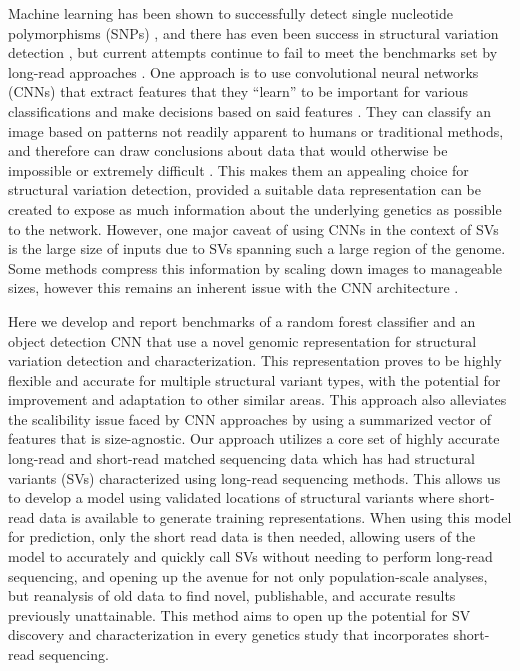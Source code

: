 Machine learning has been shown to successfully detect single nucleotide polymorphisms (SNPs) \cite{poplinUniversalSNPSmallindel2018}, and there has even been success in structural variation detection \cite{popicCueDeeplearningFramework2023,hillDeepLearningApproach2019}, but current attempts continue to fail to meet the benchmarks set by long-read approaches \cite{mahmoudStructuralVariantCalling2019}. One approach is to use convolutional neural networks (CNNs) that extract features that they “learn” to be important for various classifications and make decisions based on said features \cite{liSurveyConvolutionalNeural2022,lecunBackpropagationAppliedHandwritten1989,lecunGradientbasedLearningApplied1998}. They can classify an image based on patterns not readily apparent to humans or traditional methods, and therefore can draw conclusions about data that would otherwise be impossible or extremely difficult \cite{liSurveyConvolutionalNeural2022,guRecentAdvancesConvolutional2018,flagelUnreasonableEffectivenessConvolutional2019}. This makes them an appealing choice for structural variation detection, provided a suitable data representation can be created to expose as much information about the underlying genetics as possible to the network. However, one major caveat of using CNNs in the context of SVs is the large size of inputs due to SVs spanning such a large region of the genome. Some methods compress this information by scaling down images to manageable sizes, however this remains an inherent issue with the CNN architecture \cite{popicCueDeeplearningFramework2023,10.1093/bioinformatics/btae129}. 

Here we develop and report benchmarks of a random forest classifier and an object detection CNN that use a novel genomic representation for structural variation detection and characterization. This representation proves to be highly flexible and accurate for multiple structural variant types, with the potential for improvement and adaptation to other similar areas. This approach also alleviates the scalibility issue faced by CNN approaches by using a summarized vector of features that is size-agnostic. Our approach utilizes a core set of highly accurate long-read and short-read matched sequencing data which has had structural variants (SVs) characterized using long-read sequencing methods. This allows us to develop a model using validated locations of structural variants where short-read data is available to generate training representations. When using this model for prediction, only the short read data is then needed, allowing users of the model to accurately and quickly call SVs without needing to perform long-read sequencing, and opening up the avenue for not only population-scale analyses, but reanalysis of old data to find novel, publishable, and accurate results previously unattainable. This method aims to open up the potential for SV discovery and characterization in every genetics study that incorporates short-read sequencing.

